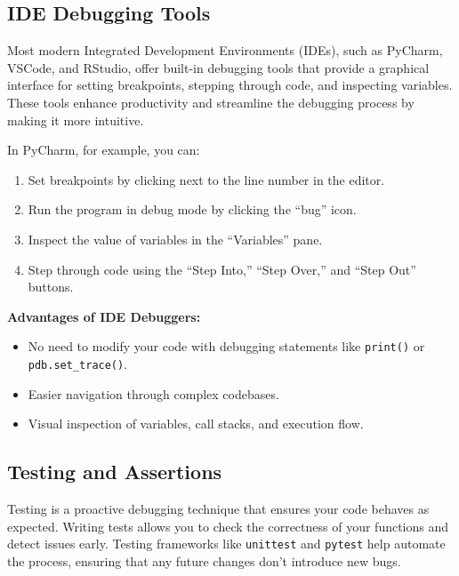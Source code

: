 \documentclass[
  letterpaper,
  DIV=11,
  numbers=noendperiod]{scrreprt}
\providecommand{\tightlist}{%
  \setlength{\itemsep}{0pt}\setlength{\parskip}{0pt}}\usepackage{longtable,booktabs,array}
\begin{document}
\hypertarget{ide-debugging-tools}{%
\subsection{IDE Debugging Tools}\label{ide-debugging-tools}}

Most modern Integrated Development Environments (IDEs), such as PyCharm,
VSCode, and RStudio, offer built-in debugging tools that provide a
graphical interface for setting breakpoints, stepping through code, and
inspecting variables. These tools enhance productivity and streamline
the debugging process by making it more intuitive.

In PyCharm, for example, you can:

\begin{enumerate}
\def\labelenumi{\arabic{enumi}.}
\tightlist
\item
  Set breakpoints by clicking next to the line number in the editor.
\item
  Run the program in debug mode by clicking the ``bug'' icon.
\item
  Inspect the value of variables in the ``Variables'' pane.
\item
  Step through code using the ``Step Into,'' ``Step Over,'' and ``Step
  Out'' buttons.
\end{enumerate}

\textbf{Advantages of IDE Debuggers:}

\begin{itemize}
\tightlist
\item
  No need to modify your code with debugging statements like
  \texttt{print()} or \texttt{pdb.set\_trace()}.
\item
  Easier navigation through complex codebases.
\item
  Visual inspection of variables, call stacks, and execution flow.
\end{itemize}

\hypertarget{testing-and-assertions}{%
\subsection{Testing and Assertions}\label{testing-and-assertions}}

Testing is a proactive debugging technique that ensures your code
behaves as expected. Writing tests allows you to check the correctness
of your functions and detect issues early. Testing frameworks like
\texttt{unittest} and \texttt{pytest} help automate the process,
ensuring that any future changes don't introduce new bugs.
\end{document}
